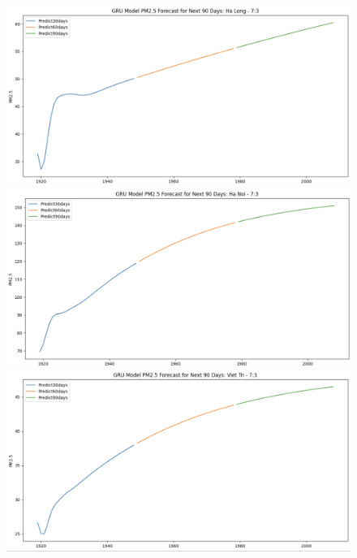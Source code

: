 \begin{figure}[H]
        \begin{minipage}{0.15\textwidth}
            \centering
            \includegraphics[width=1\textwidth]{img/final/GRU/90D/GRU_7_3_HL_90D.png}
            \end{minipage}
            \hfill
            \begin{minipage}{0.15\textwidth}
            \centering
            \includegraphics[width=1\textwidth]{img/final/GRU/90D/GRU_7_3_HN_90D.png}
            \end{minipage}
            \hfill
            \begin{minipage}{0.15\textwidth}
            \centering
            \includegraphics[width=1\textwidth]{img/final/GRU/90D/GRU_7_3_VT_90D.png}
            \end{minipage}
            \hfill
    

\end{figure}
